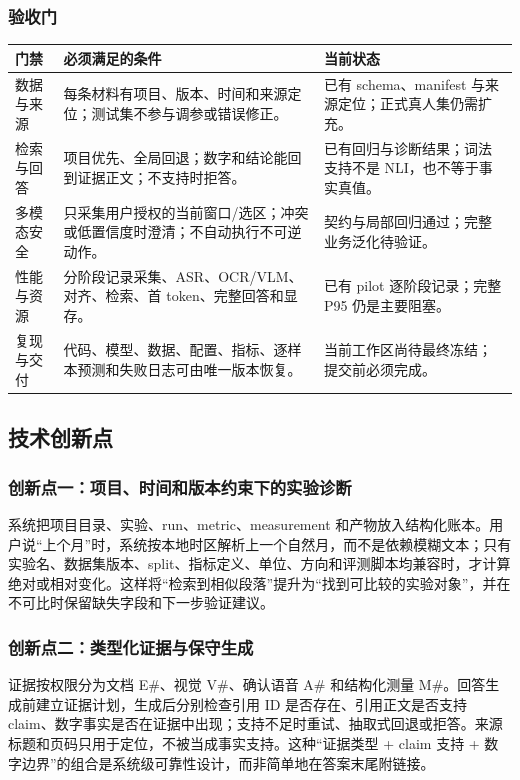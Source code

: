 \documentclass[UTF8,12pt]{ctexart}
\begin{document}
\subsubsection{验收门}
\begin{center}
\small
\begin{tabularx}{\textwidth}{>{\raggedright\arraybackslash}p{}
  >{\raggedright\arraybackslash}p{}X}
\toprule
门禁 & 必须满足的条件 & 当前状态\\
\midrule
数据与来源 & 每条材料有项目、版本、时间和来源定位；测试集不参与调参或错误修正。 & 已有 schema、manifest 与来源定位；正式真人集仍需扩充。\\
检索与回答 & 项目优先、全局回退；数字和结论能回到证据正文；不支持时拒答。 & 已有回归与诊断结果；词法支持不是 NLI，也不等于事实真值。\\
多模态安全 & 只采集用户授权的当前窗口/选区；冲突或低置信度时澄清；不自动执行不可逆动作。 & 契约与局部回归通过；完整业务泛化待验证。\\
性能与资源 & 分阶段记录采集、ASR、OCR/VLM、对齐、检索、首 token、完整回答和显存。 & 已有 pilot 逐阶段记录；完整 P95 仍是主要阻塞。\\
复现与交付 & 代码、模型、数据、配置、指标、逐样本预测和失败日志可由唯一版本恢复。 & 当前工作区尚待最终冻结；提交前必须完成。\\
\bottomrule
\end{tabularx}
\end{center}

\subsection{技术创新点}

\subsubsection{创新点一：项目、时间和版本约束下的实验诊断}
系统把项目目录、实验、run、metric、measurement 和产物放入结构化账本。用户说“上个月”时，系统按本地时区解析上一个自然月，而不是依赖模糊文本；只有实验名、数据集版本、split、指标定义、单位、方向和评测脚本均兼容时，才计算绝对或相对变化。这样将“检索到相似段落”提升为“找到可比较的实验对象”，并在不可比时保留缺失字段和下一步验证建议。

\subsubsection{创新点二：类型化证据与保守生成}
证据按权限分为文档 E\#、视觉 V\#、确认语音 A\# 和结构化测量 M\#。回答生成前建立证据计划，生成后分别检查引用 ID 是否存在、引用正文是否支持 claim、数字事实是否在证据中出现；支持不足时重试、抽取式回退或拒答。来源标题和页码只用于定位，不被当成事实支持。这种“证据类型 + claim 支持 + 数字边界”的组合是系统级可靠性设计，而非简单地在答案末尾附链接。
\end{document}

